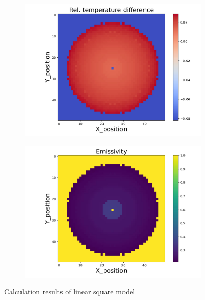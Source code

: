 \begin{figure}[htbp]
    \begin{minipage}{\textwidth}
        \centering
        \begin{subfigure}{0.49\textwidth}
            \centering
            \includegraphics[width=\textwidth]{figures/raw_data/5/lin_square/T_bias.jpg}
        \end{subfigure}
        \begin{subfigure}{0.49\textwidth}
            \centering
            \includegraphics[width=\textwidth]{figures/raw_data/5/lin_square/emi_cal.jpg}
        \end{subfigure}
    \end{minipage}
    \caption{Calculation results of linear square model}
    \label{fig: result_linear_square_model}
\end{figure}


